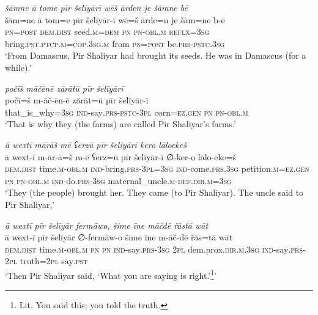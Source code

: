 \ea \label{ZP.95}
\textit{šāmne ā tome pīr šelīyārī wēš ārden je šāmne bē} \\ 
\gll šām=ne ā tom=e pīr šelīyār-ī wē=š ārde=n je šām=ne b-ē \\ 
 \textsc{pn}\textsc{=\textsc{post}} \textsc{dem.dist} seed\textsc{.m}\textsc{=dem} \textsc{pn} \textsc{pn}\textsc{-obl}\textsc{.m} \textsc{reflx}\textsc{=3sg} bring\textsc{.pst}\textsc{.ptcp}\textsc{.m}\textsc{=cop}\textsc{.3sg}\textsc{.m} from \textsc{pn}\textsc{=\textsc{post}} be\textsc{.prs}\textsc{-pstc}\textsc{.3sg} \\ 
\glt `From Damascus, Pir Shaliyar had brought its seeds. He was in Damascus (for a while).'
\z 
 
\ea \label{ZP.96}
\textit{počīš māčēnē zārātū pīr šelīyārī} \\ 
\gll počī=š m-āč-ēn-ē zārāt=ū pīr šelīyār-ī \\ 
 that\_is\_why\textsc{=3sg} \textsc{ind-}say\textsc{.prs}\textsc{-pstc}\textsc{-3pl} corn\textsc{\textsc{=ez.gen}} \textsc{pn} \textsc{pn}\textsc{-obl}\textsc{.m} \\ 
\glt `That is why they (the farms) are called Pir Shaliyar’s farms.'
\z 
 
\ea \label{ZP.97}
\textit{ā wextī mārāš mē ʕerzū pīr šelīyārī kero lāloekeš} \\ 
\gll ā wext-ī m-ār-ā=š m-ē ʕerz=ū pīr šelīyār-ī ∅-ker-o lālo-eke=š \\ 
 \textsc{dem.dist} time\textsc{.m}\textsc{-obl}\textsc{.m} \textsc{ind-}bring\textsc{.prs}\textsc{-3pl}\textsc{=3sg} \textsc{ind-}come\textsc{.prs}\textsc{.3sg} petition\textsc{.m}\textsc{\textsc{=ez.gen}} \textsc{pn} \textsc{pn}\textsc{-obl}\textsc{.m} \textsc{ind-}do\textsc{.prs}\textsc{-3sg} maternal\_uncle\textsc{.m}\textsc{-def}\textsc{.dir}\textsc{.m}\textsc{=3sg} \\ 
\glt `They (the people) brought her. They came (to Pir Shaliyar). The uncle said to Pir Shaliyar,'
\z 
 
\ea \label{ZP.126}
\textit{ā wextī pīr šelīyār fermāwo, šime īne māčdē řāstā wāt} \\ 
\gll ā wext-ī pīr šelīyār ∅-fermāw-o šime īne m-āč-dē řās=tā wāt \\ 
 \textsc{dem.dist} time\textsc{.m}\textsc{-obl}\textsc{.m} \textsc{pn} \textsc{pn} \textsc{ind-}say\textsc{.prs}\textsc{-3sg} \textsc{2pl} dem.prox\textsc{.dir}\textsc{.m}\textsc{.3sg} \textsc{ind-}say\textsc{.prs}-\textsc{2pl} truth=\textsc{2pl} say\textsc{.pst} \\ 
\glt `Then Pir Shaliyar said, ‘What you are saying is right.’\footnote{Lit. You said this; you told the truth.}'
\z 
 
